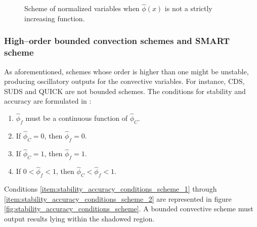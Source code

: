 \begin{figure}[h]
\begin{minipage}{.5\textwidth}
		\captionsetup{width=0.9\textwidth}
		\caption{Scheme of normalized variables when $\hat{\phi}(x)$ is not a strictly increasing function.}
		\label{fig:normalization_of_variables_2}
	\end{minipage}
\end{figure}

\subsubsection{High--order bounded convection schemes and SMART scheme}

As aforementioned, schemes whose order is higher than one might be unstable, producing oscillatory outputs for the convective variables. For instance, CDS, SUDS and QUICK are not bounded schemes. The conditions for stability and accuracy are formulated in \cite{gaskell1988curvature}:
\begin{enumerate}[label=(\roman*),topsep=0pt]
	\item $\hat{\phi}_f$ must be a continuous function of $\hat{\phi}_C$. \label{item:stability_accuracy_conditions_scheme_1}
	\item If $\hat{\phi}_C = 0$, then $\hat{\phi}_f = 0$.
	\item If $\hat{\phi}_C = 1$, then $\hat{\phi}_f = 1$.
	\item If $0 < \hat{\phi}_f < 1$, then $\hat{\phi}_C < \hat{\phi}_f < 1$.\label{item:stability_accuracy_conditions_scheme_2}
\end{enumerate}
Conditions \ref{item:stability_accuracy_conditions_scheme_1} through \ref{item:stability_accuracy_conditions_scheme_2} are represented in figure \ref{fig:stability_accuracy_conditions_scheme}. A bounded convective scheme must output results lying within the shadowed region.

